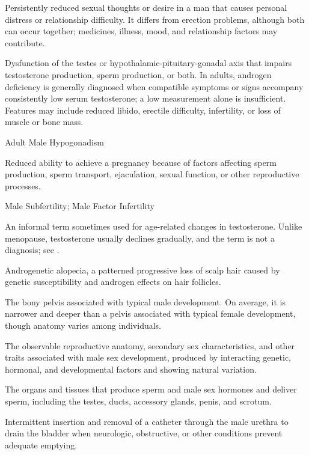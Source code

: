  Persistently reduced sexual thoughts or desire in a man that causes personal distress or relationship difficulty. It differs from erection problems, although both can occur together; medicines, illness, mood, and relationship factors may contribute.

 Dysfunction of the testes or hypothalamic-pituitary-gonadal axis that impairs testosterone production,
sperm production, or both. In adults, androgen deficiency is generally diagnosed when compatible
symptoms or signs accompany consistently low serum testosterone; a low measurement alone is
insufficient. Features may include reduced libido, erectile difficulty, infertility, or loss of muscle or bone mass.

\synonyms
Adult Male Hypogonadism

 Reduced ability to achieve a pregnancy because of factors affecting sperm production, sperm
transport, ejaculation, sexual function, or other reproductive processes.


\synonyms
Male Subfertility; Male Factor Infertility

 An informal term sometimes used for age-related changes in testosterone. Unlike menopause, testosterone usually declines gradually, and the term is not a diagnosis; see .

 Androgenetic alopecia, a patterned progressive loss of scalp hair caused by genetic susceptibility and androgen effects on hair follicles.

 The bony pelvis associated with typical male development. On average, it is narrower and deeper than a pelvis associated with typical female development, though anatomy varies among individuals.

 The observable reproductive anatomy, secondary sex characteristics, and other traits associated with male sex development, produced by interacting genetic, hormonal, and developmental factors and showing natural variation.

 The organs and tissues that produce sperm and male sex hormones and deliver sperm, including the testes, ducts, accessory glands, penis, and scrotum.

 Intermittent insertion and removal of a catheter through the male urethra to drain the bladder when neurologic, obstructive, or other conditions prevent adequate emptying.

